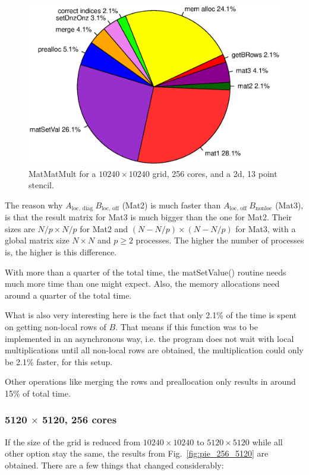 \begin{figure}[tbp]
	\centering
	\includegraphics[width=1\textwidth, trim={0 3.cm 0 3cm},clip]{256cores_10240}
	\caption{MatMatMult for a $10240\times 10240$ grid, 256 cores, and a 2d, 13 point stencil.} 
	\label{fig:pie_256_10240}
\end{figure}

The reason why $A_{\textrm{loc, diag~}} B_{\textrm{loc, off}}$ (Mat2) is much faster than $A_{\textrm{loc, off~}} B_{\textrm{nonloc}}$ (Mat3), is that the result matrix for Mat3 is much bigger than the one for Mat2. Their sizes are $N/p \times N/p$ for Mat2 and $(N-N/p) \times (N-N/p)$ for Mat3, with a global matrix size $N\times N$ and $p\geq2$ processes. The higher the number of processes is, the higher is this difference.

With more than a quarter of the total time, the matSetValue() routine needs much more time than one might expect. Also, the memory allocations need around a quarter of the total time. 

What is also very interesting here is the fact that only 2.1\% of the time is spent on getting non-local rows of $B$. That means if this function was to be implemented in an asynchronous way, i.e. the program does not wait with local multiplications until all non-local rows are obtained, the multiplication could only be 2.1\% faster, for this setup. 

Other operations like merging the rows and preallocation only results in around 15\% of total time.



\subsubsection*{5120 $\times$ 5120, 256 cores}
If the size of the grid is reduced from $10240 \times 10240$ to $5120 \times 5120$ while all other option stay the same, the results from Fig.~\ref{fig:pie_256_5120} are obtained. There are a few things that changed considerably: 

